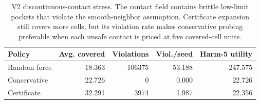 \begin{table}[h]
\centering
\small
\begin{tabular}{lrrrr}
\toprule
Policy & Avg. covered & Violations & Viol./seed & Harm-5 utility \\
\midrule
Random force & 18.363 & 106375 & 53.188 & -247.575 \\
Conservative & 22.726 & 0 & 0.000 & 22.726 \\
Certificate & 32.291 & 3974 & 1.987 & 22.356 \\
\bottomrule
\end{tabular}
\caption{V2 discontinuous-contact stress. The contact field contains brittle low-limit pockets that violate the smooth-neighbor assumption. Certificate expansion still covers more cells, but its violation rate makes conservative probing preferable when each unsafe contact is priced at five covered-cell units.}
\label{tab:discontinuous-contact-stress}
\end{table}
